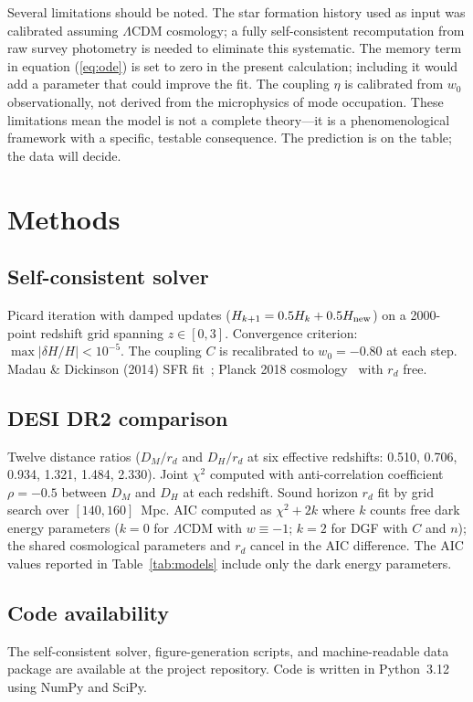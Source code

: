 \documentclass[12pt,a4paper]{article}
\begin{document}
Several limitations should be noted. The star formation history used as input was calibrated assuming $\Lambda$CDM cosmology; a fully self-consistent recomputation from raw survey photometry is needed to eliminate this systematic. The memory term in equation (\ref{eq:ode}) is set to zero in the present calculation; including it would add a parameter that could improve the fit. The coupling $\eta$ is calibrated from $w_0$ observationally, not derived from the microphysics of mode occupation. These limitations mean the model is not a complete theory---it is a phenomenological framework with a specific, testable consequence. The prediction is on the table; the data will decide.

\section*{Methods}

\subsection*{Self-consistent solver}
Picard iteration with damped updates ($H_{k+1}=0.5H_k+0.5H_{\rm new}$) on a 2000-point redshift grid spanning $z\in[0,3]$. Convergence criterion: $\max|\delta H/H|<10^{-5}$. The coupling $C$ is recalibrated to $w_0=-0.80$ at each step. Madau \& Dickinson (2014) SFR fit~\cite{madau2014}; Planck 2018 cosmology~\cite{planck2018} with $r_d$ free.

\subsection*{DESI DR2 comparison}
Twelve distance ratios ($D_M/r_d$ and $D_H/r_d$ at six effective redshifts: 0.510, 0.706, 0.934, 1.321, 1.484, 2.330). Joint $\chi^2$ computed with anti-correlation coefficient $\rho=-0.5$ between $D_M$ and $D_H$ at each redshift. Sound horizon $r_d$ fit by grid search over $[140,160]$~Mpc. AIC computed as $\chi^2+2k$ where $k$ counts free dark energy parameters ($k=0$ for $\Lambda$CDM with $w\equiv-1$; $k=2$ for DGF with $C$ and $n$); the shared cosmological parameters and $r_d$ cancel in the AIC difference. The AIC values reported in Table~\ref{tab:models} include only the dark energy parameters.

\subsection*{Code availability}
The self-consistent solver, figure-generation scripts, and machine-readable data package are available at the project repository. Code is written in Python~3.12 using NumPy and SciPy.
\end{document}
